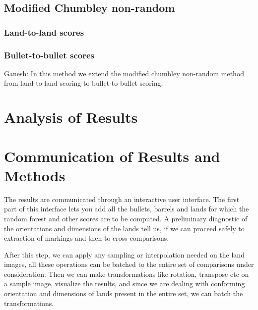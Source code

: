 \documentclass[]{book}
\begin{document}
\hypertarget{modified-chumbley-non-random}{%
\subsection{Modified Chumbley non-random}\label{modified-chumbley-non-random}}

\hypertarget{land-to-land-scores}{%
\subsubsection{Land-to-land scores}\label{land-to-land-scores}}

\hypertarget{bullet-to-bullet-scores}{%
\subsubsection{Bullet-to-bullet scores}\label{bullet-to-bullet-scores}}

Ganesh: In this method we extend the modified chumbley non-random method from land-to-land scoring to bullet-to-bullet scoring.

\hypertarget{analysis-of-results}{%
\section{Analysis of Results}\label{analysis-of-results}}

\hypertarget{communication-of-results-and-methods}{%
\section{Communication of Results and Methods}\label{communication-of-results-and-methods}}

The results are communicated through an interactive user interface. The first part of this interface lets you add all the bullets, barrels and lands for which the random forest and other scores are to be computed. A preliminary diagnostic of the orientations and dimensions of the lands tell us, if we can proceed safely to extraction of markings and then to cross-comparisons.

After this step, we can apply any sampling or interpolation needed on the land images, all these operations can be batched to the entire set of comparisons under consideration. Then we can make transformations like rotation, transpose etc on a sample image, visualize the results, and since we are dealing with conforming orientation and dimensions of lands present in the entire set, we can batch the transformations.
\end{document}
